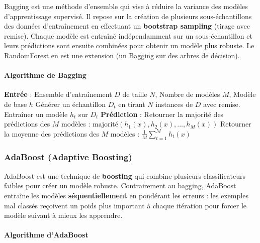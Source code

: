 Bagging est une méthode d'ensemble qui vise à réduire la variance des modèles d'apprentissage supervisé. Il repose sur la création de plusieurs sous-échantillons des données d'entraînement en effectuant un \textbf{bootstrap sampling} (tirage avec remise). Chaque modèle est entraîné indépendamment sur un sous-échantillon et leurs prédictions sont ensuite combinées pour obtenir un modèle plus robuste. Le RandomForest en est une extension (un Bagging sur des arbres de décision).

\paragraph{Algorithme de Bagging}

\begin{algorithm}[H]
\caption{Algorithme de Bagging}
\begin{algorithmic}[1]
\State \textbf{Entrée} : Ensemble d'entraînement \( D \) de taille \( N \), Nombre de modèles \( M \), Modèle de base \( h \)
    \State Générer un échantillon \( D_t \) en tirant \( N \) instances de \( D \) avec remise.
    \State Entraîner un modèle \( h_t \) sur \( D_t \)
\EndFor
\State \textbf{Prédiction} :
    \State Retourner la majorité des prédictions des \( M \) modèles : \( \text{majorité}(h_1(x), h_2(x), ..., h_M(x)) \)
\Else
    \State Retourner la moyenne des prédictions des \( M \) modèles : \( \frac{1}{M} \sum_{t=1}^{M} h_t(x) \)
\EndIf
\end{algorithmic}
\end{algorithm}


\subsubsection{AdaBoost (Adaptive Boosting)}

AdaBoost est une technique de \textbf{boosting} qui combine plusieurs classificateurs faibles pour créer un modèle robuste. Contrairement au bagging, AdaBoost entraîne les modèles \textbf{séquentiellement} en pondérant les erreurs : les exemples mal classés reçoivent un poids plus important à chaque itération pour forcer le modèle suivant à mieux les apprendre.

\paragraph{Algorithme d'AdaBoost}

